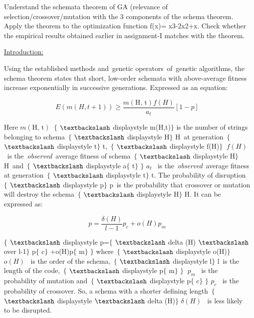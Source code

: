 \documentclass[12pt]{article}
\renewcommand{\_}{\kern-1.5pt\textunderscore\kern-1.5pt}
\begin{document}
{\fontsize{14pt}{16.8pt}\selectfont Understand the schemata theorem of GA (relevance of selection/crossover/mutation with the 3 components of the schema theorem. Apply the theorem to the optimization function f(x)= x3-2x2+x. Check whether the empirical results obtained earlier in assignment-I matches with the theorem.\par}\par

{\fontsize{14pt}{16.8pt}\selectfont \uline{Introduction:}\par}\par

\setlength{\parskip}{6.0pt}
Using the established methods and genetic operators of genetic algorithms, the schema theorem states that short, low-order schemata with above-average fitness increase exponentially in successive generations. Expressed as an equation:\par

 \[ E \left( m \left( H, t+1 \right)  \right)  \geq  \frac{m \left( \text{H, t} \right) f \left( H \right) }{a_{t}} \left[ 1-p \right]  \] \par

Here  \( m \left( \text{H, t} \right) ~ \) $ \{ $ $\textbackslash$ displaystyle m(H,t)$ \} $ is the number of strings belonging to schema $ \{ $ $\textbackslash$ displaystyle H$ \} $ H at generation $ \{ $ $\textbackslash$ displaystyle t$ \} $ t, $ \{ $ $\textbackslash$ displaystyle f(H)$ \} $  \( ~f \left( H \right)  \)  is the \textit{observed} average fitness of schema $ \{ $ $\textbackslash$ displaystyle H$ \} $ H and $ \{ $ $\textbackslash$ displaystyle a\_$ \{ $ t$ \} $ $ \} $  \( a_{t} \)  is the \textit{observed} average fitness at generation $ \{ $ $\textbackslash$ displaystyle t$ \} $ t. The probability of disruption $ \{ $ $\textbackslash$ displaystyle p$ \} $ p is the probability that crossover or mutation will destroy the schema $ \{ $ $\textbackslash$ displaystyle H$ \} $ H. It can be expressed as:\par

 \[ p=\frac{ \delta  \left( H \right) }{l-1}p_{c}+o \left( H \right) p_{m} \] \par

\setlength{\parskip}{1.2pt}
$ \{ $ $\textbackslash$ displaystyle p=$ \{ $ $\textbackslash$ delta (H) $\textbackslash$ over l-1$ \} $ p\_$ \{ $ c$ \} $ +o(H)p\_$ \{ $ m$ \} $ $ \} $ where $ \{ $ $\textbackslash$ displaystyle o(H)$ \} $  \(  o \left( H \right)  \)  is the order of the schema, $ \{ $ $\textbackslash$ displaystyle l$ \} $ l is the length of the code, $ \{ $ $\textbackslash$ displaystyle p\_$ \{ $ m$ \} $ $ \} $  \( ~p_{m} \)  is the probability of mutation and $ \{ $ $\textbackslash$ displaystyle p\_$ \{ $ c$ \} $ $ \} $  \( p_{c} \)  is the probability of crossover. So, a schema with a shorter defining length $ \{ $ $\textbackslash$ displaystyle $\textbackslash$ delta (H)$ \} $  \(   \delta  \left( H \right)  \)  is less likely to be disrupted.\par
\end{document}
